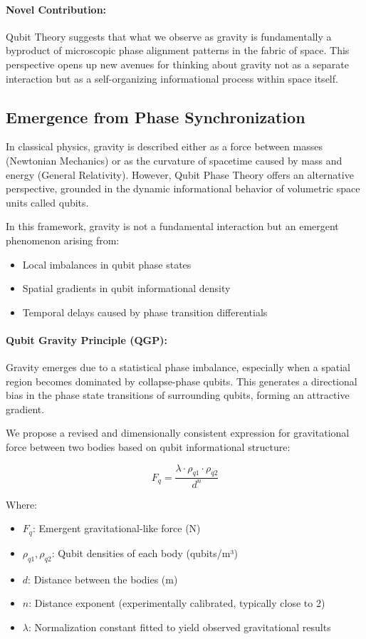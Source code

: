 \documentclass[12pt]{report} %
\begin{document}
\paragraph{Novel Contribution:}
Qubit Theory suggests that what we observe as gravity is fundamentally a byproduct of microscopic phase alignment patterns in the fabric of space. This perspective opens up new avenues for thinking about gravity not as a separate interaction but as a self-organizing informational process within space itself.


\subsection{Emergence from Phase Synchronization}

In classical physics, gravity is described either as a force between masses (Newtonian Mechanics) or as the curvature of spacetime caused by mass and energy (General Relativity). However, Qubit Phase Theory offers an alternative perspective, grounded in the dynamic informational behavior of volumetric space units called qubits.

In this framework, gravity is not a fundamental interaction but an emergent phenomenon arising from:
\begin{itemize}
  \item Local imbalances in qubit phase states
  \item Spatial gradients in qubit informational density
  \item Temporal delays caused by phase transition differentials
\end{itemize}

\paragraph{Qubit Gravity Principle (QGP):}
Gravity emerges due to a statistical phase imbalance, especially when a spatial region becomes dominated by collapse-phase qubits. This generates a directional bias in the phase state transitions of surrounding qubits, forming an attractive gradient.

We propose a revised and dimensionally consistent expression for gravitational force between two bodies based on qubit informational structure:

\[
F_q = \frac{\lambda \cdot \rho_{q1} \cdot \rho_{q2}}{d^n}
\]

Where:
\begin{itemize}
  \item \( F_q \): Emergent gravitational-like force (N)
  \item \( \rho_{q1}, \rho_{q2} \): Qubit densities of each body (qubits/m³)
  \item \( d \): Distance between the bodies (m)
  \item \( n \): Distance exponent (experimentally calibrated, typically close to 2)
  \item \( \lambda \): Normalization constant fitted to yield observed gravitational results
\end{itemize}
\end{document}
